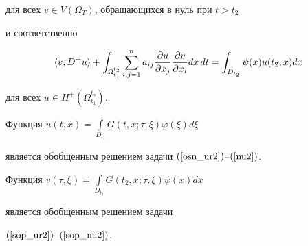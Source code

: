для всех $v\in V(\Omega_T)$, обращающихся в нуль при $t>t_2$


и соответственно


\begin{equation}


\la v,D^+ u\ra+


\int_{\Omega_{t_1}^{t_2} }


\sum_{i,j=1}^n a_{ij}\frac{\partial u}{\partial x_j}


\frac{\partial v}{\partial x_i} dx\,dt=


\int_{D_{t_2}} \psi(x)u(t_2,x) dx


\label{4.8}


\end{equation} 


для всех $u \in H^+(\Omega_{t_1}^{t_2})$.





\begin{lem}


Функция $u(t,x)=\int\limits_{D_{t_1}} G(t,x;\tau,\xi) \varphi(\xi) d\xi$


является обобщенным решением задачи $(\ref{osn_ur2})$--$(\ref{nu2})$.


Функция $v(\tau,\xi)=\int\limits_{D_{t_2}} G(t_2,x;\tau,\xi) \psi(x) dx$


является обобщенным решением задачи


$(\ref{sop_ur2})$--$(\ref{sop_nu2})$.


\end{lem}





